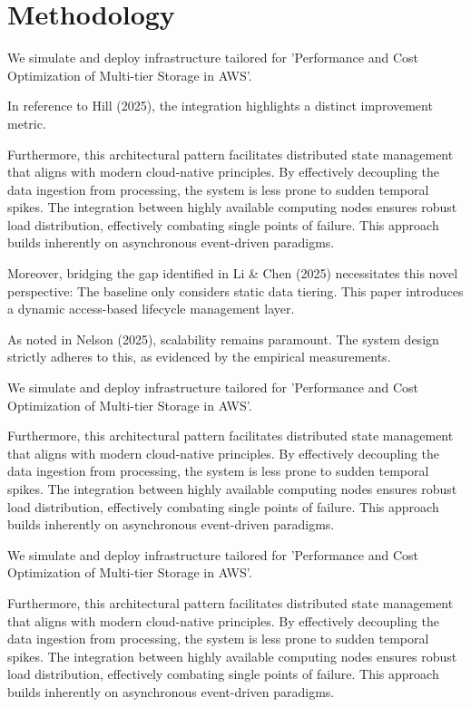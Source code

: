 \chapter{Methodology}
We simulate and deploy infrastructure tailored for 'Performance and Cost Optimization of Multi-tier Storage in AWS'.

In reference to Hill (2025), the integration highlights a distinct improvement metric.


Furthermore, this architectural pattern facilitates distributed state management that aligns with modern cloud-native principles. 
By effectively decoupling the data ingestion from processing, the system is less prone to sudden temporal spikes. 
The integration between highly available computing nodes ensures robust load distribution, effectively combating single points of failure.
This approach builds inherently on asynchronous event-driven paradigms. 


Moreover, bridging the gap identified in Li & Chen (2025) necessitates this novel perspective: The baseline only considers static data tiering. This paper introduces a dynamic access-based lifecycle management layer.

As noted in Nelson (2025), scalability remains paramount. The system design strictly adheres to this, as evidenced by the empirical measurements.

We simulate and deploy infrastructure tailored for 'Performance and Cost Optimization of Multi-tier Storage in AWS'.


Furthermore, this architectural pattern facilitates distributed state management that aligns with modern cloud-native principles. 
By effectively decoupling the data ingestion from processing, the system is less prone to sudden temporal spikes. 
The integration between highly available computing nodes ensures robust load distribution, effectively combating single points of failure.
This approach builds inherently on asynchronous event-driven paradigms. 


We simulate and deploy infrastructure tailored for 'Performance and Cost Optimization of Multi-tier Storage in AWS'.


Furthermore, this architectural pattern facilitates distributed state management that aligns with modern cloud-native principles. 
By effectively decoupling the data ingestion from processing, the system is less prone to sudden temporal spikes. 
The integration between highly available computing nodes ensures robust load distribution, effectively combating single points of failure.
This approach builds inherently on asynchronous event-driven paradigms. 


